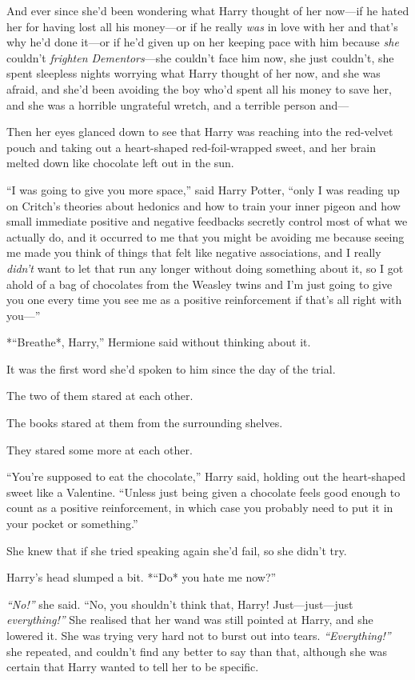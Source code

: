 And ever since she'd been wondering what Harry thought of her now---if
he hated her for having lost all his money---or if he really \emph{was}
in love with her and that's why he'd done it---or if he'd given up on
her keeping pace with him because \emph{she} couldn't \emph{frighten
Dementors}---she couldn't face him now, she just couldn't, she spent
sleepless nights worrying what Harry thought of her now, and she was
afraid, and she'd been avoiding the boy who'd spent all his money to
save her, and she was a horrible ungrateful wretch, and a terrible
person and---

Then her eyes glanced down to see that Harry was reaching into the
red-velvet pouch and taking out a heart-shaped red-foil-wrapped sweet,
and her brain melted down like chocolate left out in the sun.

``I was going to give you more space,'' said Harry Potter, ``only I was
reading up on Critch's theories about hedonics and how to train your
inner pigeon and how small immediate positive and negative feedbacks
secretly control most of what we actually do, and it occurred to me that
you might be avoiding me because seeing me made you think of things that
felt like negative associations, and I really \emph{didn't} want to let
that run any longer without doing something about it, so I got ahold of
a bag of chocolates from the Weasley twins and I'm just going to give
you one every time you see me as a positive reinforcement if that's all
right with you---''

*``Breathe*, Harry,'' Hermione said without thinking about it.

It was the first word she'd spoken to him since the day of the trial.

The two of them stared at each other.

The books stared at them from the surrounding shelves.

They stared some more at each other.

``You're supposed to eat the chocolate,'' Harry said, holding out the
heart-shaped sweet like a Valentine. ``Unless just being given a
chocolate feels good enough to count as a positive reinforcement, in
which case you probably need to put it in your pocket or something.''

She knew that if she tried speaking again she'd fail, so she didn't try.

Harry's head slumped a bit. *``Do* you hate me now?''

\emph{``No!''} she said. ``No, you shouldn't think that, Harry!
Just---just---just \emph{everything!''} She realised that her wand was
still pointed at Harry, and she lowered it. She was trying very hard not
to burst out into tears. \emph{``Everything!''} she repeated, and
couldn't find any better to say than that, although she was certain that
Harry wanted to tell her to be specific.

